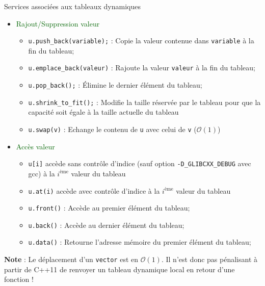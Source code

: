 \documentclass[compress,10pt,aspectratio=169]{beamer}
\begin{document}
\begin{frame}[fragile]{Services associées aux tableaux dynamiques}
    \scriptsize

\begin{itemize}
\scriptsize
\item\textcolor{DarkGreen}{Rajout/Suppression valeur}
\begin{itemize}\scriptsize
\item \texttt{u.push\_back(variable);} : Copie la valeur contenue dans \texttt{variable} à la fin du tableau;
\item \texttt{u.emplace\_back(valeur)} : Rajoute la valeur \texttt{valeur} à la fin du tableau;
\item \texttt{u.pop\_back();} : \'Elimine le dernier élément du tableau;
\item \texttt{u.shrink\_to\_fit();} : Modifie la taille réservée par le tableau pour que la capacité soit égale à la taille actuelle du tableau
\item \texttt{u.swap(v)} : Echange le contenu de \texttt{u} avec celui de \texttt{v} ($\mathcal{O}(1)$)
\end{itemize}
\item\textcolor{DarkGreen}{Accès valeur}
\begin{itemize}\scriptsize
\item \texttt{u[i]} accède sans contrôle d'indice (sauf option \texttt{-D\_GLIBCXX\_DEBUG} avec gcc) à la $i^{\mbox{ème}}$ valeur du tableau
\item \texttt{u.at(i)} accède avec contrôle d'indice à la $i^{\mbox{ème}}$ valeur du tableau 
\item \texttt{u.front()} : Accède au premier élément du tableau;
\item \texttt{u.back()}  : Accède au dernier élément du tableau;
\item \texttt{u.data()}  : Retourne l'adresse mémoire du premier élément du tableau;
\end{itemize}
\end{itemize}
\textcolor{NavyBlue}{\textbf{Note}} : Le déplacement d'un \texttt{vector} est en $\mathcal{O}(1)$. Il n'est donc pas pénalisant à partir 
de C++11 de renvoyer un tableau dynamique local en retour d'une fonction !
\end{frame}
\end{document}
